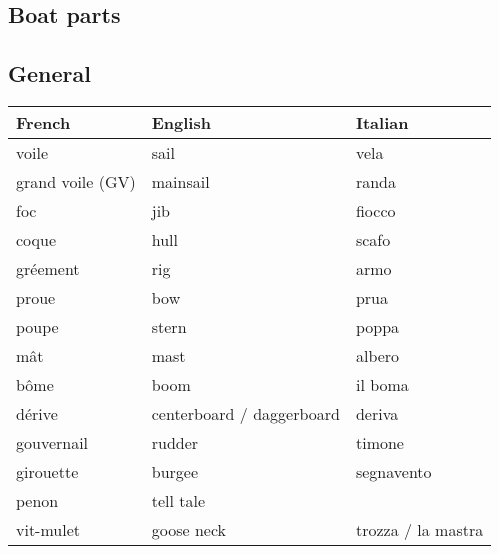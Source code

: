 \documentclass[a4paper, 12pt, twoside]{article}
\begin{document}
    \begin{indt}{\section{Boat parts}} %
        \begin{indt}{\subsection{General}} %
            \begin{tabular}{|l|l|l|}
                \hline %
                \textbf{French}
                & \textbf{English}
                & \textbf{Italian}
                \\
                \hline
                \hline %
                voile %
                & sail
                & vela
                \\
                \hline %
                grand voile (GV) %
                & mainsail
                & randa
                \\
                \hline %
                foc %
                & jib
                & fiocco
                \\
                \hline %
                coque %
                & hull
                & scafo
                \\
                \hline %
                gréement %
                & rig
                & armo
                \\
                \hline %
                proue %
                & bow
                & prua
                \\
                \hline %
                poupe %
                & stern
                & poppa
                \\
                \hline %
                mât %
                & mast
                & albero
                \\
                \hline %
                bôme %
                & boom
                & il boma
                \\
                \hline %
                dérive %
                & centerboard / daggerboard 
                & deriva
                \\
                \hline %
                gouvernail  %
                & rudder
                & timone
                \\
                \hline %
                girouette %
                & burgee
                & segnavento
                \\
                \hline %
                penon %
                & tell tale
                &
                \\
                \hline %
                vit-mulet %
                & goose neck
                & trozza / la mastra
                \\
                \hline %
            \end{tabular}
        \end{indt} %


\end{indt}
\end{document}
